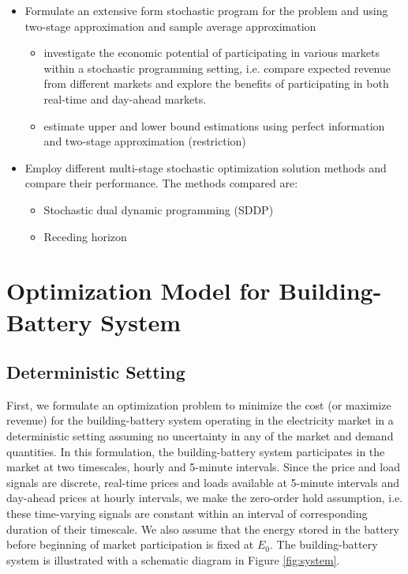 \documentclass[11pt,twoside]{article}
\begin{document}
\begin{itemize}
\item Formulate an extensive form stochastic program for the problem and using two-stage approximation and sample average approximation
\begin{itemize}
\item investigate the economic potential of participating in various markets within a stochastic programming setting, i.e. compare expected revenue from different markets and explore the benefits of participating in both real-time and day-ahead markets.
\item estimate upper and lower bound estimations using perfect information and two-stage approximation (restriction)
\end{itemize}
\item Employ different multi-stage stochastic optimization solution methods and compare their performance. The methods compared are:
\begin{itemize}
\item Stochastic dual dynamic programming (SDDP)
\item Receding horizon 
\end{itemize}
\end{itemize}

\section{Optimization Model for Building-Battery System}\label{sec:model}
\subsection{Deterministic Setting}\label{subsec:deterministic}
First, we formulate an optimization problem to minimize the cost (or maximize revenue) for the building-battery system operating in the electricity market in a deterministic setting assuming no uncertainty in any of the market and demand quantities. In this formulation, the building-battery system participates in the market at two timescales, hourly and 5-minute intervals. Since the price and load signals are discrete, real-time prices and loads available at 5-minute intervals and day-ahead prices at hourly intervals, we make the zero-order hold assumption, i.e. these time-varying signals are constant within an interval of corresponding duration of their timescale. We also assume that the energy stored in the battery before beginning of market participation is fixed at $E_{0}$. The building-battery system is illustrated with a schematic diagram in Figure \ref{fig:system}.
\end{document}
